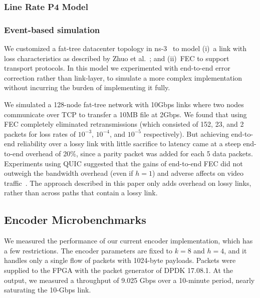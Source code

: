 \subsubsection{Line Rate P4 Model} 




\subsubsection{Event-based simulation}
We customized a fat-tree datacenter topology in ns-3~\cite{ns3-dcn} to
model (i)~a link with loss characteristics as described by Zhuo et
al.~\cite{Zhuo:2017:UMP:3098822.3098849}; and (ii)~FEC to support
transport protocols. In this model we experimented with end-to-end
error correction rather than link-layer, to simulate a more complex
implementation without incurring the burden of implementing it fully.

We simulated a 128-node fat-tree network with 10Gbps links where two
nodes communicate over TCP to transfer a 10MB file at 2Gbps. We found
that using FEC completely eliminated retransmissions (which consisted
  of 152, 23, and 2 packets for loss rates of $10^{-3}$, $10^{-4}$,
and $10^{-5}$ respectively). But achieving end-to-end reliability
over a lossy link with little sacrifice to latency came at a steep
end-to-end overhead of 20\%, since a parity packet was added for each
5 data packets.
Experiments using QUIC suggested that the gains of end-to-end FEC did not
outweigh the bandwidth overhead (even if $h=1$) and adverse affects on video
traffic~\cite[\S7.3]{Langley:2017:QTP:3098822.3098842}.
The approach described in this paper only adds
overhead on lossy links, rather than across paths that contain a
lossy link.


\subsection{Encoder Microbenchmarks}

We measured the performance of our current encoder implementation, which has a
few restrictions.  The encoder parameters are fixed to $k = 8$ and $h = 4$,
and it handles only a single flow of packets with 1024-byte payloads.
Packets were supplied to the FPGA with the packet generator of DPDK 17.08.1.
At the output, we measured a throughput of 9.025 Gbps over a 10-minute period,
nearly saturating the 10-Gbps link.


